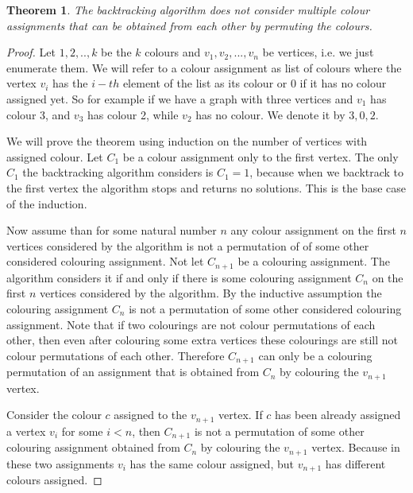 \documentclass{report}
\theoremstyle{plain}
\newtheorem{theorem}{Theorem}
\theoremstyle{definition}
\theoremstyle{remark}
\numberwithin{definition}{chapter}
\numberwithin{example}{chapter}
\numberwithin{figure}{chapter}
\numberwithin{theorem}{chapter}
\numberwithin{lemma}{chapter}
\begin{document}
\begin{theorem}
The backtracking algorithm does not consider multiple colour assignments that can be obtained from each other by permuting the colours.
\end{theorem}

\begin{proof}
Let $1,2,..,k$ be the $k$ colours and $v_1,v_2,...,v_n$ be vertices, i.e. we just enumerate them. We will refer to a colour assignment as list of colours where the vertex $v_i$ has the $i-th$ element of the list as its colour or 0 if it has no colour assigned yet. So for example if we have a graph with three vertices and $v_1$ has colour 3, and $v_3$ has colour 2, while $v_2$ has no colour. We denote it by $3,0,2$.

We will prove the theorem using induction on the number of vertices with assigned colour. Let $C_1$ be a colour assignment only to the first vertex. The only $C_1$ the backtracking algorithm considers is $C_1=1$, because when we backtrack to the first vertex the algorithm stops and returns no solutions. This is the base case of the induction.

Now assume than for some natural number $n$ any colour assignment on the first $n$ vertices considered by the algorithm is not a permutation of of some other considered colouring assignment. Not let $C_{n+1}$ be a colouring assignment. The algorithm considers it if and only if there is some colouring assignment $C_n$ on the first $n$ vertices considered by the algorithm. By the inductive assumption the colouring assignment $C_n$ is not a permutation of some other considered colouring assignment. Note that if two colourings are not colour permutations of each other, then even after colouring some extra vertices these colourings are still not colour permutations of each other. Therefore $C_{n+1}$ can only be a colouring permutation of an assignment that is obtained from $C_n$ by colouring the $v_{n+1}$ vertex. 

Consider the colour $c$ assigned to the $v_{n+1}$ vertex. If $c$ has been already assigned a vertex $v_i$ for some $i<n$, then $C_{n+1}$ is not a permutation of some other colouring assignment obtained from $C_n$ by colouring the $v_{n+1}$ vertex. Because in these two assignments $v_i$ has the same colour assigned, but $v_{n+1}$ has different colours assigned.


\end{proof}
\end{document}

